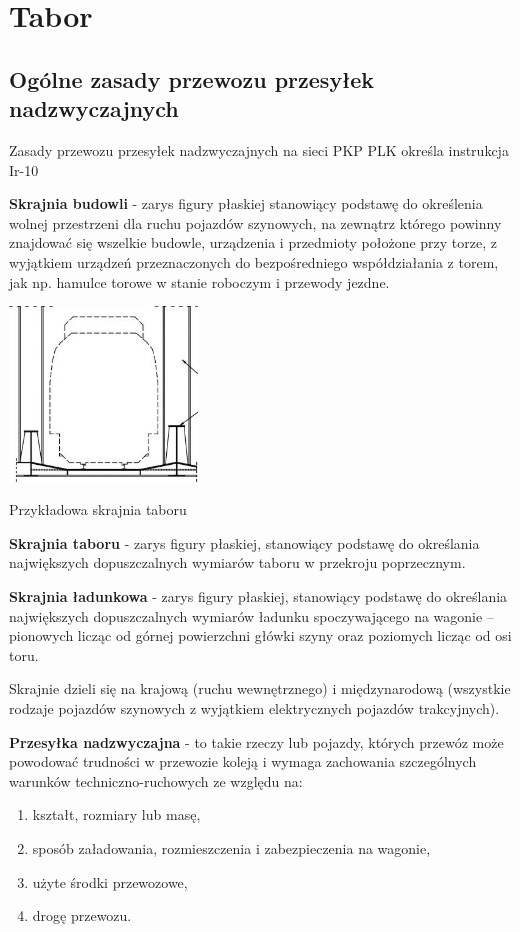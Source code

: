\part{Tabor}

\chapter{Ogólne zasady przewozu przesyłek nadzwyczajnych}
Zasady przewozu przesyłek nadzwyczajnych na sieci PKP PLK określa instrukcja Ir-10

\textbf{Skrajnia budowli} - zarys figury płaskiej stanowiący podstawę do określenia wolnej przestrzeni dla ruchu pojazdów szynowych, na zewnątrz którego powinny znajdować się wszelkie budowle, urządzenia i przedmioty położone przy torze, z wyjątkiem urządzeń przeznaczonych do bezpośredniego współdziałania z torem, jak np. hamulce torowe w stanie roboczym i przewody jezdne.

\begin{marginfigure}
	\includegraphics[width=5cm]{skryptkierownik-img/skrajnia.jpg}
	\caption{Przykładowa skrajnia taboru}
\end{marginfigure}
\textbf{Skrajnia taboru} - zarys figury płaskiej, stanowiący podstawę do określania największych dopuszczalnych wymiarów taboru w przekroju poprzecznym.

\textbf{Skrajnia ładunkowa} - zarys figury płaskiej, stanowiący podstawę do określania największych dopuszczalnych wymiarów ładunku spoczywającego na wagonie – pionowych licząc od górnej powierzchni główki szyny oraz poziomych licząc od osi toru.

Skrajnie dzieli się na krajową (ruchu wewnętrznego) i międzynarodową (wszystkie rodzaje pojazdów szynowych z wyjątkiem elektrycznych pojazdów trakcyjnych).

\textbf{Przesyłka nadzwyczajna} - to takie rzeczy lub pojazdy, których przewóz może powodować trudności w przewozie koleją i wymaga zachowania szczególnych warunków techniczno-ruchowych ze względu na: 

\begin{enumerate}
	\item kształt, rozmiary lub masę,
	\item sposób załadowania, rozmieszczenia i zabezpieczenia na wagonie,
	\item użyte środki przewozowe,
	\item drogę przewozu.
\end{enumerate}

